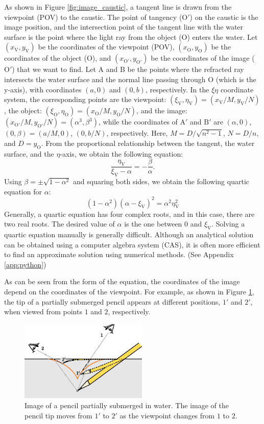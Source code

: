 \documentclass[twocolumn]{article}
\begin{document}
As shown in Figure \ref{fig:image_caustic}, a tangent line is drawn from the viewpoint (POV) to the caustic. The point of tangency ($\mathrm{O'}$) on the caustic is the image position, and the intersection point of the tangent line with the water surface is the point where the light ray from the object ($\mathrm{O}$) enters the water.
Let $(x_{\mathrm{V}}, y_{\mathrm{V}})$ be the coordinates of the viewpoint (POV), $(x_{\mathrm{O}}, y_{\mathrm{O}})$ be the coordinates of the object ($\mathrm{O}$), and $(x_{\mathrm{O'}}, y_{\mathrm{O'}})$ be the coordinates of the image ($\mathrm{O'}$) that we want to find. Let A and B be the points where the refracted ray intersects the water surface and the normal line passing through O (which is the y-axis), with coordinates $(a, 0)$ and $(0, b)$, respectively. In the $\xi\eta$ coordinate system, the corresponding points are the viewpoint: $(\xi_{\mathrm{V}}, \eta_{\mathrm{V}})=(x_{\mathrm{V}}/M, y_{\mathrm{V}}/N)$, the object: $(\xi_{\mathrm{O}}, \eta_{\mathrm{O}})=(x_{\mathrm{O}}/M, y_{\mathrm{O}}/N)$, and the image: $(x_{\mathrm{O'}}/M, y_{\mathrm{O'}}/N)=(\alpha^3, \beta^3)$, while the coordinates of $\mathrm{A'}$ and $\mathrm{B'}$ are $(\alpha, 0)$, $(0, \beta)=(a/M, 0)$, $(0, b/N)$, respectively. Here, $M=D/\sqrt{n^2-1}$, $N=D/n$, and $D=y_{\mathrm{O}}$. From the proportional relationship between the tangent, the water surface, and the $\eta$-axis, we obtain the following equation:
$$\dfrac{\eta_{\mathrm{V}}}{\xi_{\mathrm{V}}-\alpha}=-\dfrac{\beta}{\alpha}.$$
Using $\beta = \pm \sqrt{1-\alpha^2}$ and squaring both sides, we obtain the following quartic equation for $\alpha$:
\[
\left( 1 - \alpha^2 \right) \left(\alpha-\xi_{\mathrm{V}} \right)^2 = \alpha^2 \eta_{\mathrm{V}}^2
\]
Generally, a quartic equation has four complex roots, and in this case, there are two real roots. The desired value of $\alpha$ is the one between 0 and $\xi_{\mathrm{V}}$. Solving a quartic equation manually is generally difficult. Although an analytical solution can be obtained using a computer algebra system (CAS), it is often more efficient to find an approximate solution using numerical methods. (See Appendix \ref{app:python})

As can be seen from the form of the equation, the coordinates of the image depend on the coordinates of the viewpoint. For example, as shown in Figure \ref{fig:pencil_view}, the tip of a partially submerged pencil appears at different positions, $1'$ and $2'$, when viewed from points $1$ and $2$, respectively.

\begin{figure}[h]
	\centering
	\includegraphics[width=2.4in]{figs/g43.eps}
	\caption{Image of a pencil partially submerged in water. The image of the pencil tip moves from $1'$ to $2'$ as the viewpoint changes from $1$ to $2$.}
	\label{fig:pencil_view}
\end{figure}
\end{document}
